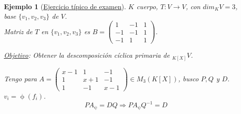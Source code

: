 \documentclass[11pt,a4paper]{article}
\theoremstyle{break}
\newtheorem{example}[theorem]{Ejemplo}
\begin{document}
\begin{example}[\underline{Ejercicio típico de examen}]
$K$ cuerpo, $T: V \to V$, con $dim_{K}V = 3$, base $\{v_{1}, v_{2}, v_{3}\}$ de $V$. \\
Matriz de $T$ en $\{v_{1}, v_{2}, v_{3}\}$ es $B = \begin{pmatrix}
1 & -1 & 1 \\
-1 & -1 & 1 \\
-1 & 1 & 1
\end{pmatrix}$.

\underline{Objetivo}: Obtener la descomposición cíclica primaria de $_{K[X]}V$.

Tengo para $A = \begin{pmatrix}
x-1 & 1 & -1 \\
1 & x+1 & -1 \\
1 & -1 & x-1
\end{pmatrix} \in M_{3}(K[X])$, busco $P, Q$ y $D$. \\
$v_{i} = \upphi(f_{i})$. 
$$PA_{\uppsi} = DQ \Rightarrow PA_{\uppsi}Q^{-1} = D$$


\end{example}
\end{document}

